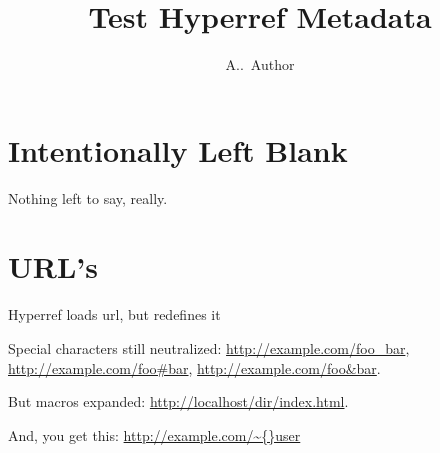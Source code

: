 \documentclass{article}
\title{Test Hyperref Metadata}
\author{A..~Author}
\begin{document}
\maketitle
\section{Intentionally Left Blank}
Nothing left to say, really.




\section{URL's}
Hyperref loads url, but redefines it

Special characters still neutralized:
 \url{http://example.com/foo_bar},
 \url{http://example.com/foo#bar},
 \url{http://example.com/foo&bar}.

\def\baz{index.html}
But macros expanded: \url{http://localhost/dir/\baz}.

And, you get this: \url{http://example.com/\~{}user}
\end{document}
